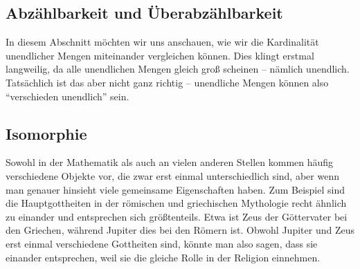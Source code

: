 \documentclass[../../main.tex]{subfiles}
\begin{document}
\subsection*{Abzählbarkeit und Überabzählbarkeit}
In diesem Abschnitt möchten wir uns anschauen, wie wir die Kardinalität unendlicher Mengen miteinander vergleichen können.
Dies klingt erstmal langweilig, da alle unendlichen Mengen gleich groß scheinen -- nämlich unendlich. Tatsächlich ist
das aber nicht ganz richtig -- unendliche Mengen können also \enquote{verschieden unendlich} sein.

\subsection*{Isomorphie}
Sowohl in der Mathematik als auch an vielen anderen Stellen kommen häufig verschiedene Objekte vor, die zwar erst einmal 
unterschiedlich sind, aber wenn man genauer hinsieht viele gemeinsame Eigenschaften haben. Zum Beispiel sind die 
Hauptgottheiten in der römischen und griechischen Mythologie recht ähnlich zu einander und entsprechen sich 
größtenteils. Etwa ist Zeus der Göttervater bei den Griechen, während Jupiter dies bei den Römern ist. Obwohl Jupiter 
und Zeus erst einmal verschiedene Gottheiten sind, könnte man also sagen, dass sie einander entsprechen, weil sie die 
gleiche Rolle in der Religion einnehmen.
\end{document}
